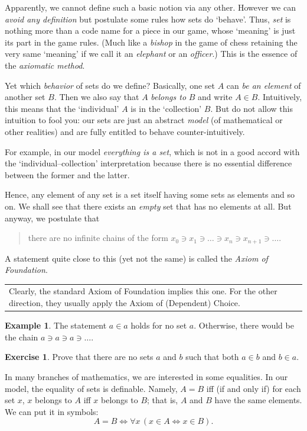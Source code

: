 \documentclass[12pt,notitlepage]{article}
\theoremstyle{plain}
\theoremstyle{definition}
\newtheorem{exc}[thm]{Exercise}
\newtheorem{exm}[thm]{Example}
\theoremstyle{plain}
\newcommand{\1}{\mathbf{1}}
\newcommand{\0}{\mathbf{0}}
\newcommand{\mcomm}[1]{
\medskip\noindent\begin{tabular}{| l}
\parbox{0.99\textwidth}{{\small
#1 }}\end{tabular}
\smallskip}
\begin{document}
Apparently, we cannot define such a basic notion via any other. However we can \emph{avoid any definition} but postulate some rules how sets do `behave'. Thus, \emph{set} is nothing more than a code name for a piece in our game, whose `meaning' is just its part in the game rules. (Much like a \emph{bishop} in the game of chess retaining the very same `meaning' if we call it an \emph{elephant} or an \emph{officer}.) This is the essence of the \emph{axiomatic method}.

Yet which \emph{behavior} of sets do we define? Basically, one set $A$ can \emph{be an element} of another set $B$. Then we also say that $A$ \emph{belongs to} $B$ and write $A \in B$. Intuitively, this means that the `individual' $A$ is in the `collection' $B$. But do not allow this intuition to fool you: our sets are just an abstract \emph{model} (of mathematical or other realities) and are fully entitled to behave counter-intuitively.

For example, in our model \emph{everything is a set}, which is not in a good accord with the `individual--collection' interpretation because there is no essential difference between the former and the latter.

Hence, any element of any set is a set itself having some sets as elements and so on. We shall see that there exists an \emph{empty} set that has no elements at all. But anyway, we postulate that
\begin{quote}
there are no infinite chains of the form $x_0 \ni x_1 \ni \ldots \ni x_n \ni x_{n+1} \ni \ldots$.
\end{quote}
A statement quite close to this (yet not the same) is called the \emph{Axiom of Foundation}.

\mcomm{Clearly, the standard Axiom of Foundation implies this one. For the other direction, they usually apply the Axiom of (Dependent) Choice.}
\begin{exm}
The statement $a \in a$ holds for no set $a$. Otherwise, there would be the chain $a \ni a \ni a \ni\ldots$.
\end{exm}
\begin{exc}
Prove that there are no sets $a$ and $b$ such that both $a \in b$ and $b \in a$.
\end{exc}

In many branches of mathematics, we are interested in some equalities. In our model, the equality of sets is definable. Namely, $A = B$ iff (if and only if) for each set $x$, $x$ belongs to $A$ iff $x$ belongs to $B$; that is, $A$ and $B$ have the same elements. We can put it in symbols:
$$A = B \iff \forall x\, (x \in A \iff x \in B).$$
\end{document}

